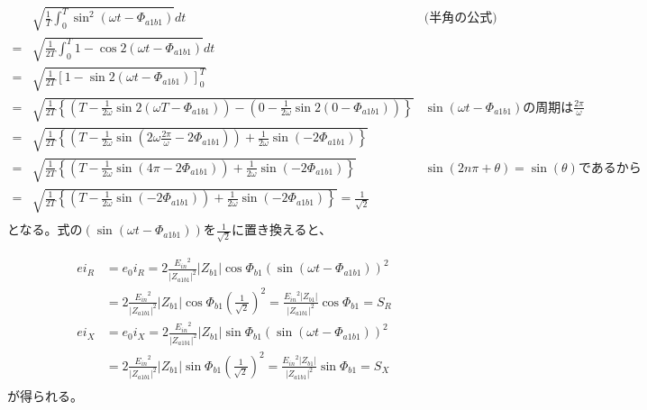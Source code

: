 \documentclass[fleqn,11pt,a4paper,dvipdfmx]{jsarticle}
\numberwithin{equation}{section}
\begin{document}
\begin{align*}
    & \sqrt{\frac{1}{T} \int_{0}^{T}  \sin^2 \left( \omega t - \Phi_{a1b1}\right)} dt               &\text{(半角の公式)}\\
  = & \sqrt{ \frac{1}{2T} \int_{0}^{T}  1 - \cos 2 \left( \omega t - \Phi_{a1b1}\right)} dt         \\
  = & \sqrt{ \frac{1}{2T} \left[  1 - \sin 2 \left( \omega t - \Phi_{a1b1}\right) \right]_{0}^{T}}  \\
  = & \sqrt{ \frac{1}{2T} \left\{ \left(T - \frac{1}{2\omega} \sin 2 \left( \omega T - \Phi_{a1b1}\right)\right) - 
  \left(0 - \frac{1}{2\omega} \sin 2 \left( 0 - \Phi_{a1b1}\right)\right) \right\} }  
  &\sin \left(\omega t - \Phi_{a1b1}\right)\text{の周期は}\frac{2\pi}{\omega}\\
  = & \sqrt{ \frac{1}{2T} \left\{ \left(T - \frac{1}{2\omega} \sin \left(2 \omega \frac{2\pi}{\omega} - 2\Phi_{a1b1}\right)\right) + 
  \frac{1}{2\omega} \sin \left(-2\Phi_{a1b1}\right) \right\} }  \\
  = & \sqrt{ \frac{1}{2T} \left\{ \left(T - \frac{1}{2\omega} \sin \left(4\pi - 2\Phi_{a1b1}\right)\right) + 
  \frac{1}{2\omega} \sin \left(-2\Phi_{a1b1}\right) \right\} }  &\sin \left(2n\pi + \theta\right) = \sin \left(\theta\right)\text{であるから}\\
  = & \sqrt{ \frac{1}{2T} \left\{ \left(T - \frac{1}{2\omega} \sin \left(- 2\Phi_{a1b1}\right)\right) + 
  \frac{1}{2\omega} \sin \left(-2\Phi_{a1b1}\right) \right\} }  = \frac{1}{\sqrt{2}} \\
\end{align*}
となる。式の$\left(\sin \left( \omega t - \Phi_{a1b1}\right)\right)$を$\frac{1}{\sqrt{2}}$に置き換えると、

\begin{align*}
  ei_R  &= e_0 i_R = 2 \frac{{E_{in}}^2}{{\left|Z_{a1b1}\right|}^2} \left|Z_{b1}\right| \cos \Phi_{b1} {\left(\sin \left( \omega t - \Phi_{a1b1}\right)\right)}^2 \\
        &= 2 \frac{{E_{in}}^2}{{\left|Z_{a1b1}\right|}^2} \left|Z_{b1}\right| \cos \Phi_{b1} \left({\frac{1}{\sqrt{2}}}\right)^2 = \frac{{E_{in}}^2 \left|Z_{b1}\right|}{{\left|Z_{a1b1}\right|}^2}\cos\Phi_{b1} = S_R  \\
  ei_X  &= e_0 i_X = 2 \frac{{E_{in}}^2}{{\left|Z_{a1b1}\right|}^2} \left|Z_{b1}\right| \sin \Phi_{b1} {\left(\sin \left( \omega t - \Phi_{a1b1}\right)\right)}^2 \\
        &= 2 \frac{{E_{in}}^2}{{\left|Z_{a1b1}\right|}^2} \left|Z_{b1}\right| \sin \Phi_{b1} \left({\frac{1}{\sqrt{2}}}\right)^2 = \frac{{E_{in}}^2 \left|Z_{b1}\right|}{{\left|Z_{a1b1}\right|}^2}\sin\Phi_{b1} = S_X  \\
\end{align*}
が得られる。
\end{document}
